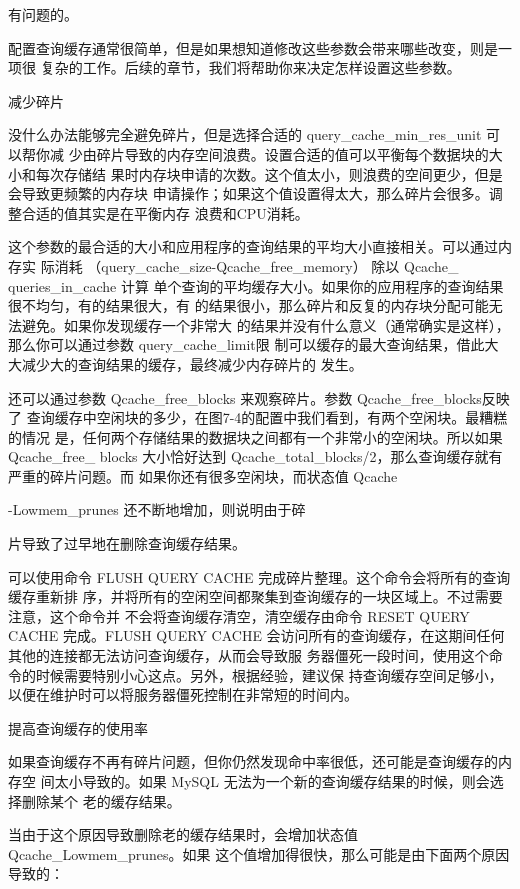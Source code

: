有问题的。

配置查询缓存通常很简单，但是如果想知道修改这些参数会带来哪些改变，则是一项很
复杂的工作。后续的章节，我们将帮助你来决定怎样设置这些参数。

减少碎片

没什么办法能够完全避免碎片，但是选择合适的 query\_cache\_min\_res\_unit 可以帮你减
少由碎片导致的内存空间浪费。设置合适的值可以平衡每个数据块的大小和每次存储结
果时内存块申请的次数。这个值太小，则浪费的空间更少，但是会导致更频繁的内存块
申请操作；如果这个值设置得太大，那么碎片会很多。调整合适的值其实是在平衡内存
浪费和CPU消耗。

这个参数的最合适的大小和应用程序的查询结果的平均大小直接相关。可以通过内存实
际消耗 （query\_cache\_size-Qcache\_free\_memory） 除以 Qcache\_ queries\_in\_cache 计算
单个查询的平均缓存大小。如果你的应用程序的查询结果很不均匀，有的结果很大，有
的结果很小，那么碎片和反复的内存块分配可能无法避免。如果你发现缓存一个非常大
的结果并没有什么意义（通常确实是这样），那么你可以通过参数 query\_cache\_limit限
制可以缓存的最大查询结果，借此大大减少大的查询结果的缓存，最终减少内存碎片的
发生。

还可以通过参数 Qcache\_free\_blocks 来观察碎片。参数 Qcache\_free\_blocks反映了
查询缓存中空闲块的多少，在图7-4的配置中我们看到，有两个空闲块。最糟糕的情况
是，任何两个存储结果的数据块之间都有一个非常小的空闲块。所以如果 Qcache\_free\_
blocks 大小恰好达到 Qcache\_total\_blocks/2，那么查询缓存就有严重的碎片问题。而
如果你还有很多空闲块，而状态值 Qcache

-Lowmem\_prunes 还不断地增加，则说明由于碎

片导致了过早地在删除查询缓存结果。

可以使用命令 FLUSH QUERY CACHE 完成碎片整理。这个命令会将所有的查询缓存重新排
序，并将所有的空闲空间都聚集到查询缓存的一块区域上。不过需要注意，这个命令并
不会将查询缓存清空，清空缓存由命令 RESET QUERY CACHE 完成。FLUSH QUERY CACHE
会访问所有的查询缓存，在这期间任何其他的连接都无法访问查询缓存，从而会导致服
务器僵死一段时间，使用这个命令的时候需要特别小心这点。另外，根据经验，建议保
持查询缓存空间足够小，以便在维护时可以将服务器僵死控制在非常短的时间内。

提高查询缓存的使用率

如果查询缓存不再有碎片问题，但你仍然发现命中率很低，还可能是查询缓存的内存空
间太小导致的。如果 MySQL 无法为一个新的查询缓存结果的时候，则会选择删除某个
老的缓存结果。

当由于这个原因导致删除老的缓存结果时，会增加状态值 Qcache\_Lowmem\_prunes。如果
这个值增加得很快，那么可能是由下面两个原因导致的：

